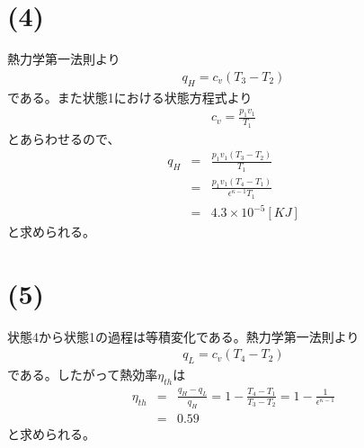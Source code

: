 \documentclass[pdflatex,ja=standard,fleqn]{bxjsarticle}
\begin{document}
\section*{(4)}
熱力学第一法則より
\begin{eqnarray*}
    q_{H}=c_{v}(T_{3}-T_{2})
\end{eqnarray*}
である。また状態1における状態方程式より
\begin{eqnarray*}
    c_{v}=\frac{p_{1}v_{1}}{T_{1}}
\end{eqnarray*}
とあらわせるので、
\begin{eqnarray*}
    q_{H}&=&\frac{p_{1}v_{1}(T_{3}-T_{2})}{T_{1}}\\
    &=&\frac{p_{1}v_{1}(T_{4}-T_{1})}{\epsilon^{\kappa-1}T_{1}}\\
    &=&4.3×10^{-5}[KJ]
\end{eqnarray*}
と求められる。
\section*{(5)}
状態4から状態1の過程は等積変化である。熱力学第一法則より
\begin{eqnarray*}
    q_{L}=c_{v}(T_{4}-T_{2})
\end{eqnarray*}
である。したがって熱効率$\eta_{th}$は
\begin{eqnarray*}
    \eta_{th}&=&\frac{q_{H}-q_{L}}{q_{H}}
    =1-\frac{T_{4}-T_{1}}{T_{3}-T_{2}}
    =1-\frac{1}{\epsilon^{\kappa-1}}\\
    &=&0.59
\end{eqnarray*}
と求められる。
\end{document}

